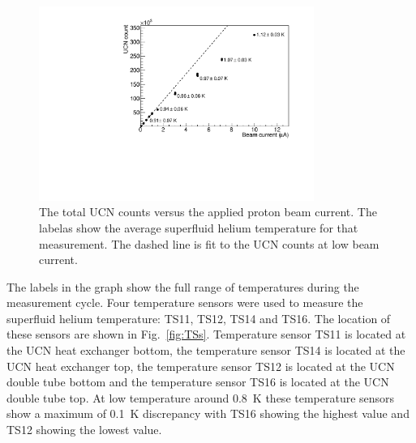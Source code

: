 \begin{figure}[h!]
  \centering
  \includegraphics[width=0.8\textwidth]{UCNCounts_vs_Beam.pdf}
  \caption{The total UCN counts versus the applied proton beam
    current. The labelas show the average superfluid helium
    temperature for that measurement. The dashed line is fit to the
    UCN counts at low beam current. }
  \label{fig:counts_vs_beam}
\end{figure}



The labels in the graph show the full range of temperatures during the
measurement cycle. Four temperature sensors were used to measure the
superfluid helium temperature: TS11, TS12, TS14 and TS16. The location
of these sensors are shown in Fig.~\ref{fig:TSs}. Temperature sensor
TS11 is located at the UCN heat exchanger bottom, the temperature
sensor TS14 is located at the UCN heat exchanger top, the temperature
sensor TS12 is located at the UCN double tube bottom and the
temperature sensor TS16 is located at the UCN double tube top. At low
temperature around 0.8~K these temperature sensors show a maximum of
0.1~K discrepancy with TS16 showing the highest value and TS12 showing
the lowest value.



